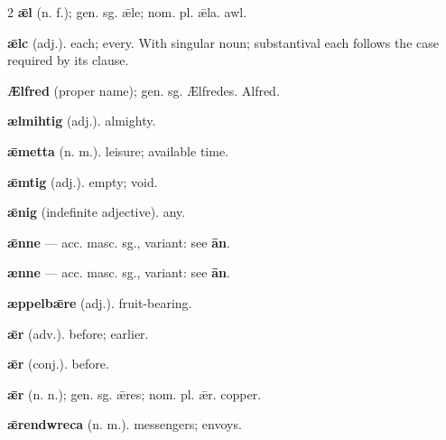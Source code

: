 \begin{multicols*}{2}
\textbf{ǣl} (n. f.); gen. sg. ǣle; nom. pl. ǣla. awl.\par
\textbf{ǣlc} (adj.). each; every. With singular noun; substantival each follows the case required by its clause.\par
\textbf{Ælfred} (proper name); gen. sg. Ælfredes. Alfred.\par
\textbf{ælmihtig} (adj.). almighty.\par
\textbf{ǣmetta} (n. m.). leisure; available time.\par
\textbf{ǣmtig} (adj.). empty; void.\par
\textbf{ǣnig} (indefinite adjective). any.\par
\textbf{ǣnne} — acc. masc. sg., variant: see \textbf{ān}.\par
\textbf{ænne} — acc. masc. sg., variant: see \textbf{ān}.\par
\textbf{æppelbǣre} (adj.). fruit-bearing.\par
\textbf{ǣr} (adv.). before; earlier.\par
\textbf{ǣr} (conj.). before.\par
\textbf{ǣr} (n. n.); gen. sg. ǣres; nom. pl. ǣr. copper.\par
\textbf{ǣrendwreca} (n. m.). messengers; envoys.\par

\end{multicols*}
